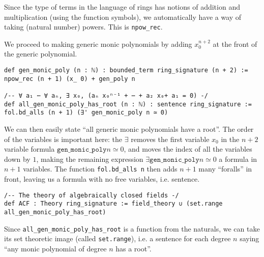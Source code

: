 \begin{dfn}
  Since the type of terms in the language of rings has notions of
  addition and multiplication (using the function symbols),
  we automatically have a way of taking (natural number) powers.
  This is \texttt{npow\_rec}.

  We proceed to making generic monic polynomials by adding
  $x_{0}^{n+2}$ at the front of the generic polynomial.

  \begin{lstlisting}
def gen_monic_poly (n : ℕ) : bounded_term ring_signature (n + 2) :=
npow_rec (n + 1) (x_ 0) + gen_poly n

/-- ∀ a₁ ⋯ ∀ aₙ, ∃ x₀, (aₙ x₀ⁿ⁻¹ + ⋯ + a₂ x₀+ a₁ = 0) -/
def all_gen_monic_poly_has_root (n : ℕ) : sentence ring_signature :=
fol.bd_alls (n + 1) (∃' gen_monic_poly n ≃ 0) \end{lstlisting}

  We can then easily state ``all generic monic polynomials have a root''.
  The order of the variables is important here:
  the $\exists$ removes the first variable $x_{0}$ in the $n+2$ variable formula
  $\texttt{gen\_monic\_poly} n \simeq 0$, and moves the index of all the
  variables down by $1$, making the remaining expression
  $\exists \texttt{gen\_monic\_poly} n \simeq 0$ a formula in $n+1$ variables.
  The function \texttt{fol.bd\_alls n} then adds $n+1$ many ``foralls''
  in front, leaving us a formula with no free variables, i.e. sentence.

  \begin{lstlisting}
/-- The theory of algebraically closed fields -/
def ACF : Theory ring_signature := field_theory ∪ (set.range all_gen_monic_poly_has_root)\end{lstlisting}

  Since \texttt{all\_gen\_monic\_poly\_has\_root} is a function from the naturals,
  we can take its set theoretic image (called \texttt{set.range}),
  i.e. a sentence for each degree $n$ saying
  ``any monic polynomial of degree $n$ has a root''.
\end{dfn}

